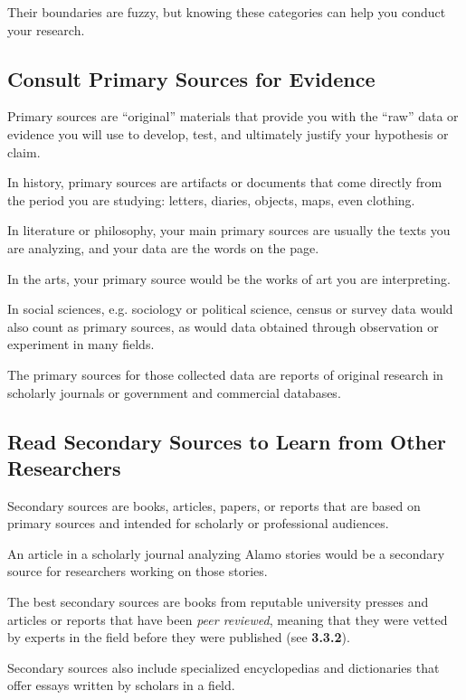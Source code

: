 \documentclass[oneside]{book}
\numberwithin{equation}{section}
\begin{document}
Their boundaries are fuzzy, but knowing these categories can help you conduct your research.

\subsection{Consult Primary Sources for Evidence}
Primary sources are ``original'' materials that provide you with the ``raw'' data or evidence you will use to develop, test, and ultimately justify your hypothesis or claim.

In history, primary sources are artifacts or documents that come directly from the period you are studying: letters, diaries, objects, maps, even clothing.

In literature or philosophy, your main primary sources are usually the texts you are analyzing, and your data are the words on the page.

In the arts, your primary source would be the works of art you are interpreting.

In social sciences, e.g. sociology or political science, census or survey data would also count as primary sources, as would data obtained through observation or experiment in many fields.

The primary sources for those collected data are reports of original research in scholarly journals or government and commercial databases.

\subsection{Read Secondary Sources to Learn from Other Researchers}
Secondary sources are books, articles, papers, or reports that are based on primary sources and intended for scholarly or professional audiences.

An article in a scholarly journal analyzing Alamo stories would be a secondary source for researchers working on those stories.


The best secondary sources are books from reputable university presses and articles or reports that have been \textit{peer reviewed}, meaning that they were vetted by experts in the field before they were published (see \textbf{3.3.2}).

Secondary sources also include specialized encyclopedias and dictionaries that offer essays written by scholars in a field.
\end{document}
